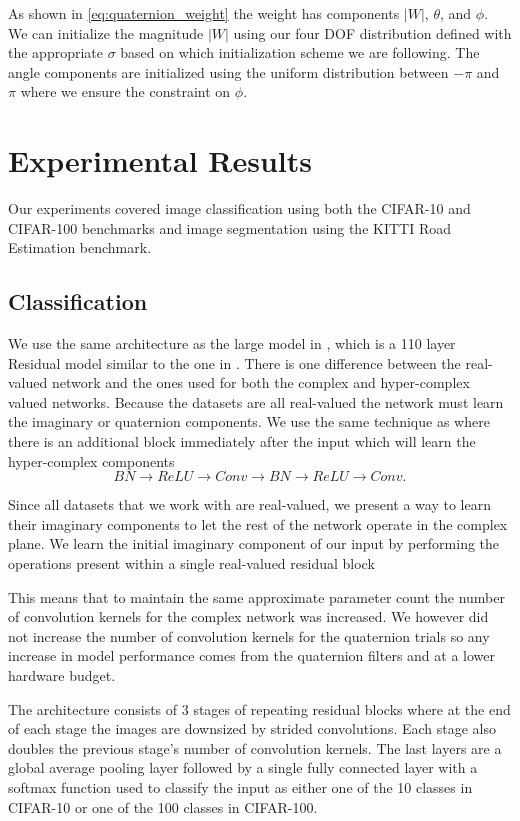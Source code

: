 As shown in \eqref{eq:quaternion_weight} the weight has components $|W|$, $\theta$, and $\phi$. 
We can initialize the magnitude $|W|$ using our four DOF distribution defined with the appropriate $\sigma$ based on which initialization scheme we are following. 
The angle components are initialized using the uniform distribution between $-\pi$ and $\pi$ where we ensure the constraint on $\phi$.


\section{Experimental Results}
Our experiments covered image classification using both the CIFAR-10 and CIFAR-100 benchmarks and image segmentation using the KITTI Road Estimation benchmark.

\subsection{Classification}
We use the same architecture as the large model in \cite{trabelsi2017deep}, which is a 110 layer Residual model similar to the one in \cite{he2016deep}.
There is one difference between the real-valued network and the ones used for both the complex and hyper-complex valued networks.
Because the datasets are all real-valued the network must learn the imaginary or quaternion components.
We use the same technique as \cite{trabelsi2017deep} where there is an additional block immediately after the input which will learn the hyper-complex components
\begin{equation*}
BN \rightarrow ReLU \rightarrow Conv \rightarrow BN \rightarrow ReLU \rightarrow Conv.
\end{equation*}

Since all datasets that we work with are real-valued,
we present a way to learn their imaginary components to let the rest of the network operate in the
complex plane. 
We learn the initial imaginary component of our input by performing the operations
present within a single real-valued residual block

This means that to maintain the same approximate parameter count the number of convolution kernels for the complex network was increased.
We however did not increase the number of convolution kernels for the quaternion trials so any increase in model performance comes from the quaternion filters and at a lower hardware budget.

The architecture consists of 3 stages of repeating residual blocks where at the end of each stage the images are downsized by strided convolutions.
Each stage also doubles the previous stage's number of convolution kernels.
The last layers are a global average pooling layer followed by a single fully connected layer with a softmax function used to classify the input as either one of the 10 classes in CIFAR-10 or one of the 100 classes in CIFAR-100.

